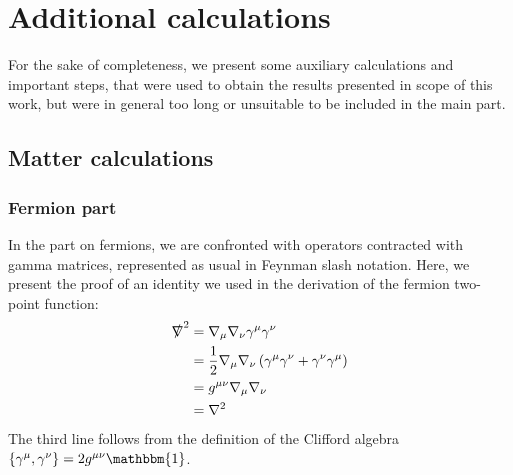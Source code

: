 \chapter{Additional calculations}\label{chap:AppB}
For the sake of completeness, we present some auxiliary calculations and important steps, that were used to obtain the results presented in scope of this work, but were in general too long or unsuitable to be included in the main part.
\section{Matter calculations}
\subsection*{Fermion part}
In the part on fermions, we are confronted with operators contracted with gamma matrices, represented as usual in Feynman slash notation. Here, we present the proof of an identity we used in the derivation of the fermion two-point function:
\begin{equation}
	\begin{aligned}
		\slashed{\nabla}^2 &= \nabla_{\mu}\nabla_{\nu}\gamma^{\mu}\gamma^{\nu} \\
		&= \frac{1}{2}\nabla_{\mu}\nabla_{\nu}\left(\gamma^{\mu}\gamma^{\nu}+\gamma^{\nu}\gamma^{\mu}\right) \\
		&=  g^{\mu\nu}\nabla_{\mu}\nabla_{\nu}\\
		&= \nabla^2
	\end{aligned}
\end{equation} 
The third line follows from the definition of the Clifford algebra $\left\{\gamma^{\mu},\gamma^{\nu}\right\} = 2g^{\mu\nu}\mathbbm{1}$.
\newpage %

